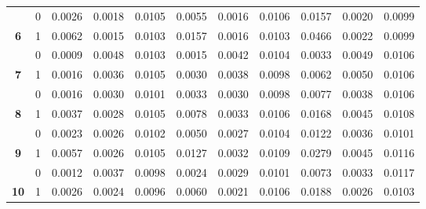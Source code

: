\begin{table}
\begin{tabular}[t]{>{}ccrrrrrrrrr}
 & 0 & 0.0026 & 0.0018 & 0.0105 & 0.0055 & 0.0016 & 0.0106 & 0.0157 & 0.0020 & 0.0099\\

\multirow[t]{-2}{*}{\centering\arraybackslash \textbf{6}} & 1 & 0.0062 & 0.0015 & 0.0103 & 0.0157 & 0.0016 & 0.0103 & 0.0466 & 0.0022 & 0.0099\\

\rule{0pt}{4ex}
 & 0 & 0.0009 & 0.0048 & 0.0103 & 0.0015 & 0.0042 & 0.0104 & 0.0033 & 0.0049 & 0.0106\\

\multirow[t]{-2}{*}{\centering\arraybackslash \textbf{7}} & 1 & 0.0016 & 0.0036 & 0.0105 & 0.0030 & 0.0038 & 0.0098 & 0.0062 & 0.0050 & 0.0106\\

 & 0 & 0.0016 & 0.0030 & 0.0101 & 0.0033 & 0.0030 & 0.0098 & 0.0077 & 0.0038 & 0.0106\\

\multirow[t]{-2}{*}{\centering\arraybackslash \textbf{8}} & 1 & 0.0037 & 0.0028 & 0.0105 & 0.0078 & 0.0033 & 0.0106 & 0.0168 & 0.0045 & 0.0108\\

 & 0 & 0.0023 & 0.0026 & 0.0102 & 0.0050 & 0.0027 & 0.0104 & 0.0122 & 0.0036 & 0.0101\\

\multirow[t]{-2}{*}{\centering\arraybackslash \textbf{9}} & 1 & 0.0057 & 0.0026 & 0.0105 & 0.0127 & 0.0032 & 0.0109 & 0.0279 & 0.0045 & 0.0116\\

\rule{0pt}{4ex}
 & 0 & 0.0012 & 0.0037 & 0.0098 & 0.0024 & 0.0029 & 0.0101 & 0.0073 & 0.0033 & 0.0117\\

\multirow[t]{-2}{*}{\centering\arraybackslash \textbf{10}} & 1 & 0.0026 & 0.0024 & 0.0096 & 0.0060 & 0.0021 & 0.0106 & 0.0188 & 0.0026 & 0.0103\\
\bottomrule
\end{tabular}
\end{table}
